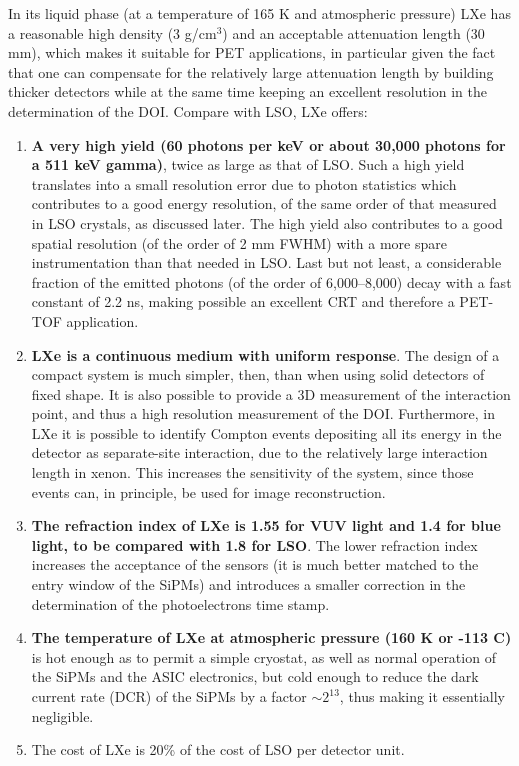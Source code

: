 \documentclass[review]{elsarticle}
\begin{document}
In its liquid phase (at a temperature of 165 K and atmospheric pressure) LXe has a reasonable high density (3 g/cm$^3$) and an acceptable attenuation length (30 mm), which makes it suitable for PET applications, in particular given the fact that one can compensate for the relatively large attenuation length by building thicker detectors while at the same time keeping an excellent resolution in the determination of the DOI. Compare with LSO, LXe offers:
\begin{enumerate}
\item {\bf A very high yield (60 photons per keV or about 30,000 photons for a 511 keV gamma)}, twice as large as that of LSO. Such a high yield translates into a small resolution error due to photon statistics which contributes to a good energy resolution, of the same order of that measured in LSO crystals, as discussed later. The high yield also contributes to a good spatial resolution (of the order of 2 mm FWHM) with a more spare instrumentation than that needed in LSO. Last but not least, a considerable fraction of the emitted photons (of the order of 6,000--8,000) decay with a fast constant of 2.2 ns, making possible an excellent CRT and therefore a PET-TOF application. 
\item {\bf LXe is a continuous medium with uniform response}. The design of a compact system is much simpler, then, than when using solid detectors of fixed shape. It is also possible to provide a 3D measurement of the interaction point, and thus a high resolution measurement of the DOI. Furthermore, in LXe it is possible to identify Compton events depositing all its energy in the detector as separate-site interaction, due to the relatively large interaction length in xenon. This increases the sensitivity of the system, since those events can, in principle, be used for image reconstruction. 
\item {\bf The refraction index of LXe is 1.55 for VUV light and 1.4 for blue light, to be compared with 1.8 for LSO}. The lower refraction index increases the acceptance of the sensors (it is much better matched to the entry window of the SiPMs) and introduces a smaller correction in the determination of the photoelectrons time stamp. 
\item {\bf The temperature of LXe at atmospheric pressure (160 K or -113 C)} is hot enough as to permit a simple cryostat, as well as normal operation of the SiPMs and the ASIC electronics, but cold enough to reduce the dark current rate (DCR) of the SiPMs by a factor $\sim 2^{13}$, thus making it essentially negligible. 
\item {The cost} of LXe is 20\% of the cost of LSO per detector unit. 
 \end{enumerate}
\end{document}
